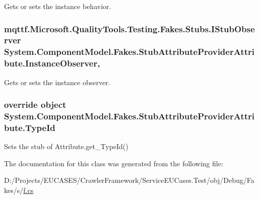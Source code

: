 Gets or sets the instance behavior.

\hypertarget{class_system_1_1_component_model_1_1_fakes_1_1_stub_attribute_provider_attribute_a3ec57dd473f6cd4eeda530f57ea26c7f}{
\subsubsection[{Instance\-Observer}]{\setlength{\rightskip}{0pt plus 5cm}mqttf.\-Microsoft.\-Quality\-Tools.\-Testing.\-Fakes.\-Stubs.\-I\-Stub\-Observer System.\-Component\-Model.\-Fakes.\-Stub\-Attribute\-Provider\-Attribute.\-Instance\-Observer\hspace{0.3cm}{\ttfamily [get]}, {\ttfamily [set]}}}\label{class_system_1_1_component_model_1_1_fakes_1_1_stub_attribute_provider_attribute_a3ec57dd473f6cd4eeda530f57ea26c7f}


Gets or sets the instance observer.

\hypertarget{class_system_1_1_component_model_1_1_fakes_1_1_stub_attribute_provider_attribute_a56c2eff8c26d76539817b74078ee7cb5}{
\subsubsection[{Type\-Id}]{\setlength{\rightskip}{0pt plus 5cm}override object System.\-Component\-Model.\-Fakes.\-Stub\-Attribute\-Provider\-Attribute.\-Type\-Id\hspace{0.3cm}{\ttfamily [get]}}}\label{class_system_1_1_component_model_1_1_fakes_1_1_stub_attribute_provider_attribute_a56c2eff8c26d76539817b74078ee7cb5}


Sets the stub of Attribute.\-get\-\_\-\-Type\-Id()



The documentation for this class was generated from the following file\-:\begin{DoxyCompactItemize}
\item 
D\-:/\-Projects/\-E\-U\-C\-A\-S\-E\-S/\-Crawler\-Framework/\-Service\-E\-U\-Cases.\-Test/obj/\-Debug/\-Fakes/s/\hyperlink{s_2f_8cs}{f.\-cs}\end{DoxyCompactItemize}
